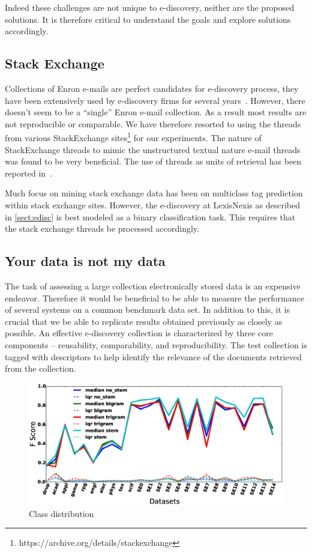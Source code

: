 \documentclass{sig-alternate-05-2015}
\newcommand{\tion}[1]{\textsection\ref{sect:#1}}
\begin{document}
Indeed these challenges are not unique to e-discovery, neither are the proposed solutions. It is therefore critical to understand the goals and explore solutions accordingly.

\subsection{Stack Exchange}
Collections of Enron e-mails are perfect candidates for e-discovery process, they have been extensively used by e-discovery firms for several years~\cite{oard2013}. However, there doesn't seem to be a ``single'' Enron e-mail collection. As a result most results are not reproducible or comparable. We have therefore resorted to using the threads from various StackExchange sites\footnote{https://archive.org/details/stackexchange} for our experiments. The nature of StackExchange threads to mimic the unstructured textual nature e-mail threads was found to be very beneficial. The use of threads as units of retrieval has been reported in~\cite{elsayed08}.

Much focus on mining stack exchange data has been on multiclass tag prediction within stack exchange sites. However, the e-discovery at LexisNexis as described in \tion{edisc} is best modeled as a binary classification task. This requires that the stack exchange threads be processed accordingly. 

\subsection{Your data is not my data}
\label{sect:ydinmd}
The task of assessing a large collection electronically stored data is an expensive endeavor. Therefore it would be beneficial to be able to measure the performance of several systems on a common benchmark data set. In addition to this, it is crucial that we be able to replicate results obtained previously as closely as possible. An effective e-discovery collection is characterized by three core components -- reusability, comparability, and reproducibility. The test collection is tagged with descriptors to help identify the relevance of the documents retrieved from the collection. 

\begin{figure}[pbt]
    \includegraphics[width=0.99\linewidth]{./fig/pre.eps}
    \caption{Class distribution}
    \label{fig:token}
\end{figure}
\end{document}
